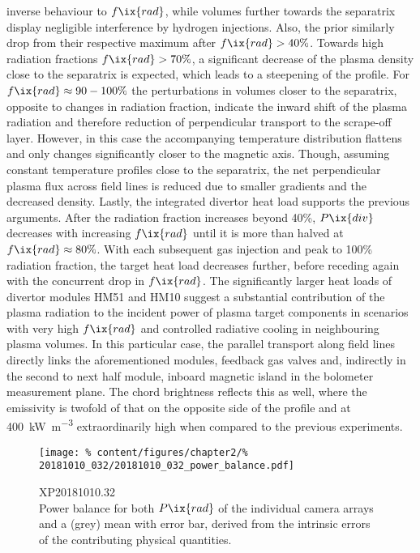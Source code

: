 inverse behaviour to $f\ix{rad}$, while volumes further towards the separatrix display negligible interference by hydrogen injections. Also, the prior similarly drop from their respective maximum after $f\ix{rad}>40\%$. Towards high radiation fractions $f\ix{rad}>70\%$, a significant decrease of the plasma density close to the separatrix is expected, which leads to a steepening of the profile. For $f\ix{rad}\approx90-100\%$ the perturbations in volumes closer to the separatrix, opposite to changes in radiation fraction, indicate the inward shift of the plasma radiation and therefore reduction of perpendicular transport to the scrape-off layer. However, in this case the accompanying temperature distribution flattens and only changes significantly closer to the magnetic axis. Though, assuming constant temperature profiles close to the separatrix, the net perpendicular plasma flux across field lines is reduced due to smaller gradients and the decreased density. Lastly, the integrated divertor heat load supports the previous arguments. After the radiation fraction increases beyond 40\%, $P\ix{div}$ decreases with increasing $f\ix{rad}$ until it is more than halved at $f\ix{rad}\approx80\%$. With each subsequent gas injection and peak to 100\% radiation fraction, the target heat load decreases further, before receding again with the concurrent drop in $f\ix{rad}$. The significantly larger heat loads of divertor modules HM51 and HM10 suggest a substantial contribution of the plasma radiation to the incident power of plasma target components in scenarios with very high $f\ix{rad}$ and controlled radiative cooling in neighbouring plasma volumes. In this particular case, the parallel transport along field lines directly links the aforementioned modules, feedback gas valves and, indirectly in the second to next half module, inboard magnetic island in the bolometer measurement plane. The chord brightness reflects this as well, where the emissivity is twofold of that on the opposite side of the profile and at \SI{400}{\kilo\watt\per\cubic\meter} extraordinarily high when compared to the previous experiments.\\%
%
            \begin{figure}[t]%
                \centering%
                \texttt{[image: \%
                    content/figures/chapter2/\%
                    20181010\_032/20181010\_032\_power\_balance.pdf]}%
                \caption{XP20181010.32\\%
                    Power balance for both $P\ix{rad}$ of the individual camera arrays and a (grey) mean with error bar, derived from the intrinsic errors of the contributing physical quantities.}\label{fig:20181010.32_balance}%
            \end{figure}%
